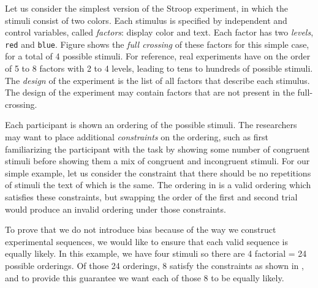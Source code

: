 Let us consider the simplest version of the Stroop experiment, in which the stimuli consist of two colors. Each stimulus is specified by independent and control variables, called \emph{factors}: display color and text. Each factor has two \emph{levels}, \texttt{red} and \texttt{blue}. Figure  shows the \emph{full crossing} of these factors for this simple case, for a total of 4 possible stimuli. For reference, real experiments have on the order of 5 to 8 factors with 2 to 4 levels, leading to tens to hundreds of possible stimuli. The \emph{design} of the experiment is the list of all factors that describe each stimulus. The design of the experiment may contain factors that are not present in the full-crossing.

Each participant is shown an ordering of the possible stimuli. The researchers may want to place additional \emph{constraints} on the ordering, such as first familiarizing the participant with the task by showing some number of congruent stimuli before showing them a mix of congruent and incongruent stimuli. For our simple example, let us consider the constraint that there should be no repetitions of stimuli the text of which is the same. The ordering in  is a valid ordering which satisfies these constraints, but swapping the order of the first and second trial would produce an invalid ordering under those constraints.

To prove that we do not introduce bias because of the way we construct experimental sequences, we would like to ensure that each valid sequence is equally likely. In this example, we have four stimuli so there are 4 factorial = 24 possible orderings. Of those 24 orderings, 8 satisfy the constraints as shown in , and to provide this guarantee we want each of those 8 to be equally likely.


